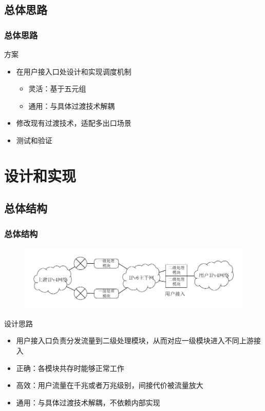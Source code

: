 \documentclass{beamer}
\begin{document}
\subsection{总体思路}
\begin{frame}
  \frametitle{总体思路}

  \begin{block}{方案}
    \begin{itemize}
    \item 在用户接入口处设计和实现调度机制
      \begin{itemize}
      \item 灵活：基于五元组
      \item 通用：与具体过渡技术解耦
      \end{itemize}
    \item 修改现有过渡技术，适配多出口场景
    \item 测试和验证
    \end{itemize}
  \end{block}
\end{frame}

\section{设计和实现}
\subsection{总体结构}
\begin{frame}
  \frametitle{总体结构}
  \vspace{-1em}

  \begin{figure}
    \includegraphics[width=\textwidth]{figs/21-ipv6-multi-egress.pdf}
  \end{figure}
  \vspace{-1em}

  \begin{block}{设计思路}
    \begin{itemize}
    \item 用户接入口负责分发流量到二级处理模块，从而对应一级模块进入不同上游接入
    \item 正确：各模块共存时能够正常工作
    \item 高效：用户流量在千兆或者万兆级别，间接代价被流量放大
    \item 通用：与具体过渡技术解耦，不依赖内部实现
    \end{itemize}
  \end{block}
\end{frame}
\end{document}

